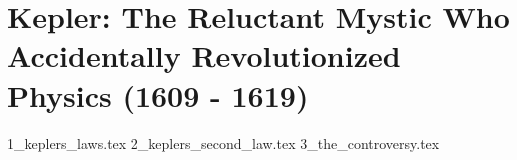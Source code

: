 \section{Kepler: The Reluctant Mystic Who Accidentally Revolutionized Physics (1609 - 1619)}

{1_keplers_laws.tex}
{2_keplers_second_law.tex}
{3_the_controversy.tex}